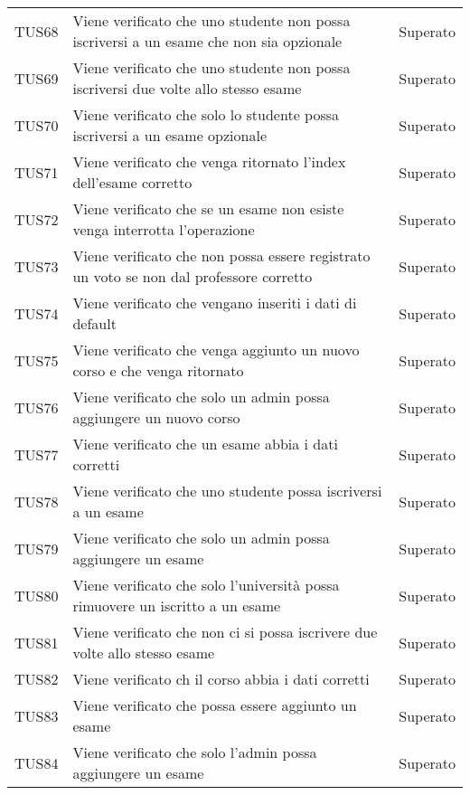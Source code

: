 \documentclass[PianoDiQualifica.tex]{subfiles}
\begin{document}
\begin{longtable}[H]{P{2cm}P{8.5cm}P{3cm}}
	TUS68 & Viene verificato che uno studente non possa iscriversi a un esame che non sia opzionale & Superato \\
	TUS69 & Viene verificato che uno studente non possa iscriversi due volte allo stesso esame & Superato \\
	TUS70 & Viene verificato che solo lo studente possa iscriversi a un esame opzionale & Superato \\
	TUS71 & Viene verificato che venga ritornato l'index dell'esame corretto & Superato \\
	TUS72 & Viene verificato che se un esame non esiste venga interrotta l'operazione & Superato \\
	TUS73 & Viene verificato che non possa essere registrato un voto se non dal professore corretto & Superato \\
	TUS74 & Viene verificato che vengano inseriti i dati di default & Superato \\
	TUS75 & Viene verificato che venga aggiunto un nuovo corso e che venga ritornato & Superato \\
	TUS76 & Viene verificato che solo un admin possa aggiungere un nuovo corso & Superato \\
	TUS77 & Viene verificato che un esame abbia i dati corretti & Superato \\
	TUS78 & Viene verificato che uno studente possa iscriversi a un esame & Superato \\
	TUS79 & Viene verificato che solo un admin possa aggiungere un esame & Superato \\
	TUS80 & Viene verificato che solo l'università possa rimuovere un iscritto a un esame & Superato \\
	TUS81 & Viene verificato che non ci si possa iscrivere due volte allo stesso esame & Superato \\
	TUS82 & Viene verificato ch il corso abbia i dati corretti & Superato \\
	TUS83 & Viene verificato che possa essere aggiunto un esame & Superato \\
	TUS84 & Viene verificato che solo l'admin possa aggiungere un esame & Superato \\
	

\end{longtable}
\end{document}
